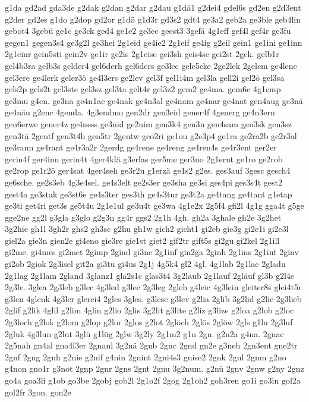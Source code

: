 {g1da
gd2ad
gda3de
g2dak
g2dan
g2dar
g2dau
g1dä1
g2dei4
gdel6s
gd2en
g2d3ent
g2der
gd2es
g1do
g2dop
gd2or
g1dö
g1d3r
gd3s2
gdt4
ge3a2
geb2a
ge3ble
geb4lin
gebot4
3gebü
ge1c
ge3ck
ged4
ge1e2
ge3ec
geest3
3gefä
4g1eff
gef4l
gef4r
ge3fu
gegen1
gegen3s4
ge3g2l
ge3hei
2g1eid
ge4ie2
2g1eif
ge4ig
g2eil
gein1
ge1ini
ge1inn
2g1einr
gein5sti
gein2v
ge1ir
ge2is
2g1eise
gei3sh
geis4sc
gei2st
2gek.
gelb1r
gel4b3ra
gelb3s
gelder4
gel6derh
gel6ders
ge3lec
gele5cke
2ge2lek
2gelem
ge4lene
gel3ere
ge4lerk
geler3ö
ge4l3ers
ge2lev
gel3f
gel1i4m
gel3la
gell2i
gel2ö
gel3sa
gels2p
gels2t
gel3ste
gel3sz
gel3ta
gelt4r
gel3z2
gem2
ge4ma.
gem6e
4g1emp
ge3mu
g4en.
ge3na
ge4n1ac
ge4nak
ge4n3al
ge4nam
ge4nar
ge4nat
gen4aug
ge3nä
ge4näu
g2enc
4genda.
4g3endmo
gen2dr
gen3eid
gener4f
4generg
ge4n3ern
gen6erwe
gener4z
ge4ness
ge3nid
ge2nim
gen3k4
gen3n
gen4sam
gen3sk
gen3sz
gen3tä
2gentf
gen3t4h
gen5tr
2gentw
geo2ri
ge1ou
g2e3p4
ge1ra
ge2ra2b
ge2r3al
ge3rann
ge4rant
ge4r3a2r
2gerdg
ge4rene
ge4reng
ge4ren4s
ge4r3ent
ger2er
gerin4f
ger4inn
gerin4t
4ger4klä
g3erlas
ger5me
ger3no
2g1ernt
ge1ro
ge2rob
ge2rop
ge1r2ö
ger4sat
4ger4seh
ge3r2u
g1erzä
ge1s2
g2es.
ges3auf
3gesc
gesch4
ge6sche.
ge2s3eb
4g3e4sel.
ge4s3elt
ge2s3er
ge3sha
ge3si
ges4pi
ges3s4t
gest2
gest4a
ge3stak
ge3st6e
ge4s3ter
ges3th
ge4s3tur
ge3t2a
ge4tang
ge4tant
g1etap
ge3ti
get4ri
get3s
ge5t4u
2g1e1ul
ge3u4t
ge3wa
4g1e2x
2g5f4
gfi2l
4g1g
gga4t
g5ge
gge2ne
gg2l
g3gla
g3glo
g2g3n
gg4r
ggs2
2g1h
4gh.
gh2a
3ghale
gh2e
3g2het
3g2hie
gh1l
3gh2r
ghs2
gh3sc
g2hu
gh1w
gich2
gicht1
gi2eb
gie3g
gi2e1i
gi2e3l
giel2a
gie3n
gien2e
gi4eno
gie3re
gie1st
giet2
gif2tr
gift5s
gi2gu
gi2kel
2g1ill
gi2me.
gi4mes
gi2met
2gimp
2gind
gi3ne
2g1inf
gin2ga
2ginh
2g1ins
2g1int
2ginv
gi2ob
2giok
2g3isel
git2a
gi3tu
gi4us
2g1j
4g5k4
gl2
4gl.
4g1lab
2g1lac
2gladu
2g1lag
2g1lam
2gland
3glanz1
gla2s1c
glas3t4
3g2laub
2g1lauf
2gläuf
gl3b
g2l4e
2g3le.
3glea
2g3leb
g3lec
4g3led
g3lee
2g3leg
2gleh
g4leic
4g3lein
gleiter8s
glei4t5r
g3len
4glenk
4g3ler
glerei4
2gles
3gles.
g3lese
g3lev
g2lia
2glib
3g2lid
g2lie
2g3lieb
2glif
g2lik
4glil
g2lim
4glin
g2lio
2glis
3g2lit
g3lite
g2liz
g3lize
g2loa
g2lob
g2loc
2g3loch
g2lok
g2lom
g2lop
g2lor
2glos
g2lot
2glöch
2glös
2glöw
2gls
g1lu
2g3luf
2gluk
4g3lun
g2lut
3glü
g1lüg
2glw
3g2ly
2g1m2
g1n
2gn.
g2n2a
g4na.
2gnac
2g5nah
gn4al
gna4l3er
2gnanl
3g2nä
2gnb
2gnc
2gnd
gn2e
g3neh
2gn3ent
gne2tr
2gnf
2gng
2gnh
g2nie
g2nif
g4nin
2gnint
2gni4s3
gnise2
2gnk
2gnl
2gnm
g2no
g4non
gno1r
g3not
2gnp
2gnr
2gns
2gnt
2gnu
3g2num.
g2nü
2gnv
2gnw
g2ny
2gnz
go4a
goa3li
g1ob
go3be
2gobj
gob2l
2g1o2f
2gog
2g1oh2
goh3ren
go1i
go3in
gol2a
gol2fr
3gon.
gon2e
}
